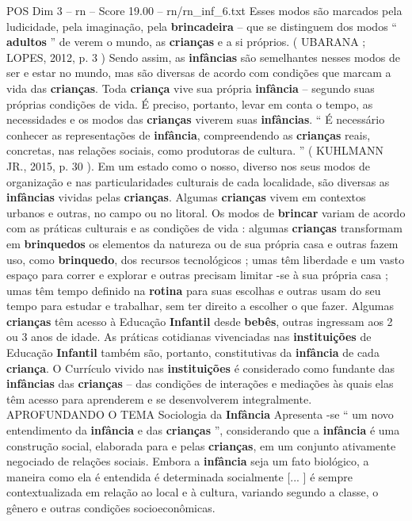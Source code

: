 \begin{textsample}{POS Dim 3 – rn – Score 19.00 – rn/rn\_inf\_6.txt}
Esses modos são marcados pela ludicidade, pela imaginação, pela \textbf{brincadeira} – que se distinguem dos modos “ \textbf{adultos} ” de verem o mundo, as \textbf{crianças} e a si próprios. ( UBARANA ; LOPES, 2012, p. 3 ) Sendo assim, as \textbf{infâncias} são semelhantes nesses modos de ser e estar no mundo, mas são diversas de acordo com condições que marcam a vida das \textbf{crianças}.
Toda \textbf{criança} vive sua própria \textbf{infância} – segundo suas próprias condições de vida.
É preciso, portanto, levar em conta o tempo, as necessidades e os modos das \textbf{crianças} viverem suas \textbf{infâncias}. “ É necessário conhecer as representações de \textbf{infância}, compreendendo as \textbf{crianças} reais, concretas, nas relações sociais, como produtoras de cultura. ” ( KUHLMANN JR., 2015, p. 30 ).
Em um estado como o nosso, diverso nos seus modos de organização e nas particularidades culturais de cada localidade, são diversas as \textbf{infâncias} vividas pelas \textbf{crianças}.
Algumas \textbf{crianças} vivem em contextos urbanos e outras, no campo ou no litoral.
Os modos de \textbf{brincar} variam de acordo com as práticas culturais e as condições de vida : algumas \textbf{crianças} transformam em \textbf{brinquedos} os elementos da natureza ou de sua própria casa e outras fazem uso, como \textbf{brinquedo}, dos recursos tecnológicos ; umas têm liberdade e um vasto espaço para correr e explorar e outras precisam limitar -se à sua própria casa ; umas têm tempo definido na \textbf{rotina} para suas escolhas e outras usam do seu tempo para estudar e trabalhar, sem ter direito a escolher o que fazer.
Algumas \textbf{crianças} têm acesso à Educação \textbf{Infantil} desde \textbf{bebês}, outras ingressam aos 2 ou 3 anos de idade.
As práticas cotidianas vivenciadas nas \textbf{instituições} de Educação \textbf{Infantil} também são, portanto, constitutivas da \textbf{infância} de cada \textbf{criança}.
O Currículo vivido nas \textbf{instituições} é considerado como fundante das \textbf{infâncias} das \textbf{crianças} – das condições de interações e mediações às quais elas têm acesso para aprenderem e se desenvolverem integralmente.
APROFUNDANDO O TEMA Sociologia da \textbf{Infância} Apresenta -se “ um novo entendimento da \textbf{infância} e das \textbf{crianças} ”, considerando que a \textbf{infância} é uma construção social, elaborada para e pelas \textbf{crianças}, em um conjunto ativamente negociado de relações sociais.
Embora a \textbf{infância} seja um fato biológico, a maneira como ela é entendida é determinada socialmente [... ] é sempre contextualizada em relação ao local e à cultura, variando segundo a classe, o gênero e outras condições socioeconômicas.

\end{textsample}
